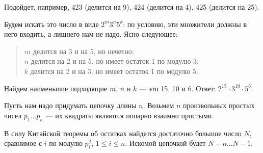 ﻿
\begin{itemize}

\itA Подойдет, например, 423 (делится на 9), 424 (делится на 4), 425 (делится на 25).

\itB Будем искать это число в виде $2^m3^n5^k$: по условию, эти множители должны в него входить, а лишнего нам не надо. Ясно следующее:

\begin{quote}
$m$ делится на 3 и на 5, но нечетно; \\
$n$ делится на 2 и на 5, но имеет остаток 1 по модулю 3;\\
$k$ делится на 2 и на 3, но имеет остаток 1 по модулю 5.
\end{quote}

Найдем наименьшие подходящие $m$, $n$ и $k$ — это 15, 10 и 6. Ответ: $2^{15} \cdot 3^{10} \cdot 5^6$.

\itC Пусть нам надо придумать цепочку длины $n$. Возьмем $n$ произвольных простых чисел $p_1 \ldots p_n$ — их квадраты являются попарно взаимно простыми.

В силу Китайской теоремы об остатках найдется достаточно большое число $N$, сравнимое с $i$ по модулю $p_i^2$, $1 \le i \le n$. Искомой цепочкой будет $N-n \ldots N-1$.
\end{itemize}
